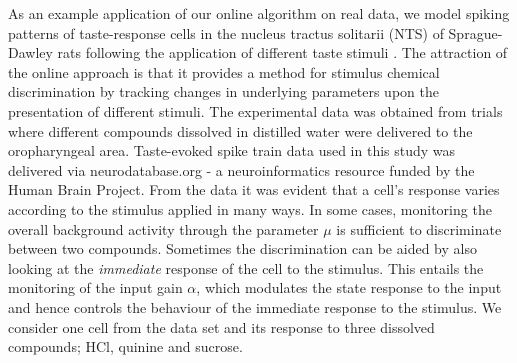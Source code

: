 \documentclass{article}
\begin{document}
As an example application of our online algorithm on real data, we model spiking patterns of
taste-response cells in the nucleus tractus solitarii (NTS) of Sprague-Dawley rats following the
application of different taste stimuli \cite{Lorenzo_2003}.  The attraction of the online approach
is that it provides a method for stimulus chemical discrimination by tracking changes in underlying
parameters upon the presentation of different stimuli.  The experimental data was obtained from
trials where different compounds dissolved in distilled water were delivered to the oropharyngeal area. Taste-evoked spike train data used in this study was delivered via neurodatabase.org - a neuroinformatics resource funded by
the Human Brain Project. From the data it was evident that a cell's response varies according to the stimulus applied in many ways. In some cases, monitoring the overall background activity through the parameter $\mu$ is sufficient to discriminate between two compounds. Sometimes the discrimination can be aided by also looking at the \emph{immediate} response of the cell to the stimulus. This entails the monitoring of the input gain $\alpha$, which modulates the state response to the input and hence controls the behaviour of the immediate response to the stimulus. We consider one cell from the data set and its response to three dissolved compounds; HCl, quinine and sucrose.


\end{document}
